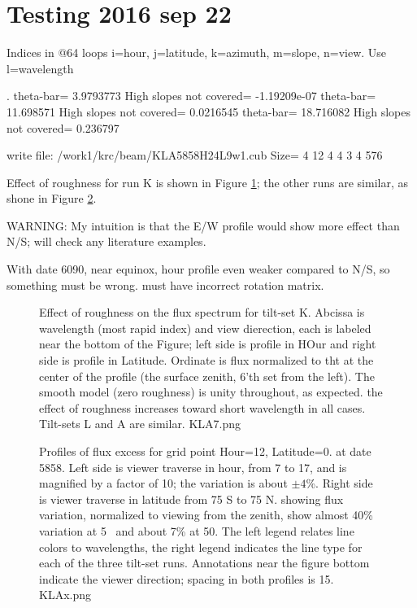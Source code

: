 \documentclass{article}
\begin{document}

\section{Testing 2016 sep 22}
 Indices in @64 loops i=hour, j=latitude, k=azimuth, m=slope, n=view.
 Use l=wavelength

.
\qi theta-bar=       3.9793773 High slopes not covered= -1.19209e-07
\qi theta-bar=       11.698571 High slopes not covered=    0.0216545
\qi theta-bar=       18.716082 High slopes not covered=     0.236797

write  file: /work1/krc/beam/KLA5858H24L9w1.cub Size=  4 12 4 4 3 4 576

Effect of roughness for run K is shown in Figure \ref{KLA7}; the other runs are
similar, as shone in Figure \ref{KLAx}.

WARNING: My intuition is that the E/W profile would show more effect than N/S;
will check any literature examples.

With date 6090, near equinox, hour profile even weaker compared to N/S,
 so something must be wrong. must have incorrect rotation matrix.

\begin{figure}[!ht] 
\caption[Effect of roughness]{Effect of roughness on the flux spectrum for
  tilt-set K. Abcissa is wavelength (most rapid index) and view dierection, each
  is labeled near the bottom of the Figure; left side is profile in HOur and
  right side is profile in Latitude. Ordinate is flux normalized to tht at the
  center of the profile (the surface zenith, 6'th set from the left). The smooth
  model (zero roughness) is unity throughout, as expected. the effect of
  roughness increases toward short wavelength in all cases. Tilt-sets L and A
  are similar.
\label{KLA7} KLA7.png  }
\end{figure} 

\begin{figure}[!ht] 
\caption[Flux profiles]{Profiles of flux excess for grid point Hour=12,
  Latitude=0. at date 5858. Left side is viewer traverse in hour, from 7 to 17,
  and is magnified by a factor of 10; the variation is about $\pm 4$\%.  Right
  side is viewer traverse in latitude from 75 S to 75 N. showing flux variation,
  normalized to viewing from the zenith, show almost 40\% variation at 5\um~ and
  about 7\% at 50\um. The left legend relates line colors to wavelengths, the
  right legend indicates the line type for each of the three tilt-set
  runs. Annotations near the figure bottom indicate the viewer direction;
  spacing in both profiles is 15\qd.
\label{KLAx}  KLAx.png  }
\end{figure} 
\end{document}
